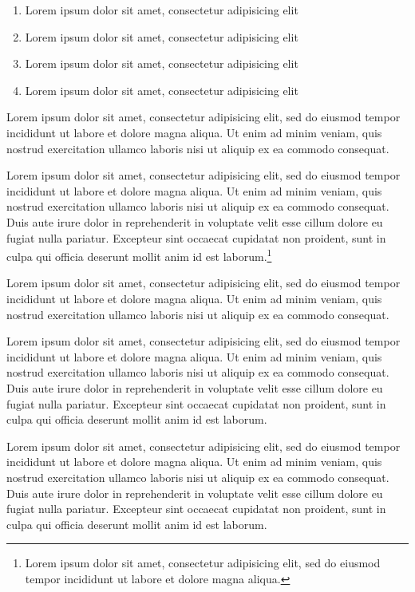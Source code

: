 \documentclass{article}
\begin{document}
 
\begin{enumerate}
\item Lorem ipsum dolor sit amet, consectetur adipisicing elit
\item Lorem ipsum dolor sit amet, consectetur adipisicing elit
\item Lorem ipsum dolor sit amet, consectetur adipisicing elit
\item Lorem ipsum dolor sit amet, consectetur adipisicing elit
\end{enumerate}

\begin{theorem}
Lorem ipsum dolor sit amet, consectetur adipisicing elit, sed do eiusmod tempor incididunt ut labore et dolore magna aliqua. Ut enim ad minim veniam, quis nostrud exercitation ullamco laboris nisi ut aliquip ex ea commodo consequat. 
\end{theorem}

Lorem ipsum dolor sit amet, consectetur adipisicing elit, sed do eiusmod tempor incididunt ut labore et dolore magna aliqua. Ut enim ad minim veniam, quis nostrud exercitation ullamco laboris nisi ut aliquip ex ea commodo consequat. Duis aute irure dolor in reprehenderit in voluptate velit esse cillum dolore eu fugiat nulla pariatur. Excepteur sint occaecat cupidatat non proident, sunt in culpa qui officia deserunt mollit anim id est laborum.\footnote{Lorem ipsum dolor sit amet, consectetur adipisicing elit, sed do eiusmod tempor incididunt ut labore et dolore magna aliqua.}

\begin{remark}
Lorem ipsum dolor sit amet, consectetur adipisicing elit, sed do eiusmod tempor incididunt ut labore et dolore magna aliqua. Ut enim ad minim veniam, quis nostrud exercitation ullamco laboris nisi ut aliquip ex ea commodo consequat. 
\end{remark}

Lorem ipsum dolor sit amet, consectetur adipisicing elit, sed do eiusmod tempor incididunt ut labore et dolore magna aliqua. Ut enim ad minim veniam, quis nostrud exercitation ullamco laboris nisi ut aliquip ex ea commodo consequat. Duis aute irure dolor in reprehenderit in voluptate velit esse cillum dolore eu fugiat nulla pariatur. Excepteur sint occaecat cupidatat non proident, sunt in culpa qui officia deserunt mollit anim id est laborum.

Lorem ipsum dolor sit amet, consectetur adipisicing elit, sed do eiusmod tempor incididunt ut labore et dolore magna aliqua. Ut enim ad minim veniam, quis nostrud exercitation ullamco laboris nisi ut aliquip ex ea commodo consequat. Duis aute irure dolor in reprehenderit in voluptate velit esse cillum dolore eu fugiat nulla pariatur. Excepteur sint occaecat cupidatat non proident, sunt in culpa qui officia deserunt mollit anim id est laborum.
\end{document}
